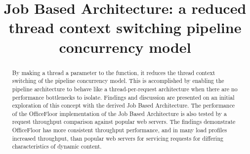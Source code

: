\documentclass[conference]{ieee/IEEEtran}
\begin{document}
\title{Job Based Architecture: a reduced thread context switching pipeline
concurrency model}


\author{
}


% 








\maketitle


\begin{abstract}
By making a thread a parameter to the function, it reduces the thread context
switching of the pipeline concurrency model.  This is accomplished by enabling
the pipeline architecture to behave like a thread-per-request architecture when
there are no performance bottlenecks to isolate.  Findings and discussion are
presented on an initial exploration of this concept with the derived Job Based
Architecture.  The performance of the OfficeFloor implementation of the Job
Based Architecture is also tested by a request throughput comparison against
popular web servers.  The findings demonstrate OfficeFloor has more consistent
throughput performance, and in many load profiles increased throughput, than
popular web servers for servicing requests for differing characteristics of
dynamic content.
\end{abstract}
\end{document}
